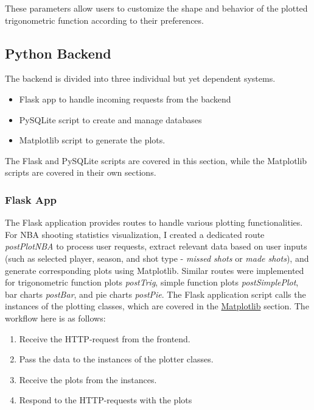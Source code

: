\documentclass[sn-mathphys-num]{sn-jnl}%
\theoremstyle{thmstyleone}%
\theoremstyle{thmstyletwo}%
\theoremstyle{thmstylethree}%
\begin{document}
These parameters allow users to customize the shape and behavior of the plotted trigonometric function according to their preferences.


\subsection{Python Backend}\label{subsubsec2}

The backend is divided into three individual but yet dependent systems.
\bigskip
\begin{itemize}
    \item Flask app to handle incoming requests from the backend
    \item PySQLite script to create and manage databases
    \item Matplotlib script to generate the plots.
\end{itemize}
\bigskip
The Flask and PySQLite scripts are covered in this section, while the Matplotlib scripts are covered in their own sections.

\subsubsection{Flask App}\label{subsubsubsec1}

The Flask application provides routes to handle various plotting functionalities. For NBA shooting statistics visualization, I created a dedicated route \textit{postPlotNBA} to process user requests, extract relevant data based on user inputs (such as selected player, season, and shot type - \textit{missed shots} or \textit{made shots}), and generate corresponding plots using Matplotlib. Similar routes were implemented for trigonometric function plots \textit{postTrig}, simple function plots \textit{postSimplePlot}, bar charts \textit{postBar}, and pie charts \textit{postPie}. The Flask application script calls the instances of the plotting classes, which are covered in the \hyperref[sec4]{Matplotlib} section. The workflow here is as follows:

\bigskip
\begin{enumerate}
    \item Receive the HTTP-request from the frontend.
    \item Pass the data to the instances of the plotter classes.
    \item Receive the plots from the instances.
    \item Respond to the HTTP-requests with the plots
\end{enumerate}
\bigskip
\end{document}
